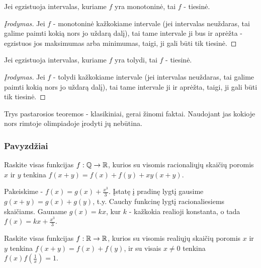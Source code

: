 \begin{thm}
  Jei egzistuoja intervalas, kuriame $f$ yra monotoninė, tai $f$ - tiesinė.
\end{thm}

\begin{proof}[Įrodymas]
  Jei $f$ - monotoninė kažkokiame intervale (jei intervalas neuždaras, tai
  galime paimti kokią nors jo uždarą dalį), tai tame intervale ji bus ir
  aprėžta - egzistuos jos maksimumas arba minimumas, taigi, ji gali
  būti tik tiesinė.
\end{proof}

\begin{thm}
  Jei egzistuoja intervalas, kuriame $f$ yra tolydi, tai $f$ - tiesinė.
\end{thm}

\begin{proof}[Įrodymas]
  Jei $f$ - tolydi kažkokiame intervale (jei intervalas neuždaras, tai
  galime paimti kokią nors jo uždarą dalį), tai tame intervale ji ir aprėžta,
  taigi, ji gali būti tik tiesinė.
\end{proof}

Trys pastarosios teoremos - klasikiniai, gerai žinomi faktai. Naudojant jas
kokioje nors rimtoje olimpiadoje įrodyti jų nebūtina.

\subsubsection{Pavyzdžiai}

\begin{pavnr}
  Raskite visas funkcijas $f:\mathbb Q\to\mathbb R$, kurios su visomis racionaliųjų
  skaičių poromis $x$ ir $y$ tenkina $f(x+y)=f(x)+f(y)+xy(x+y)$.
\end{pavnr}

\begin{sprendimas}
  Pakeiskime - $f(x)=g(x)+\frac{x^{3}}{3}$. Įstatę į pradinę lygtį gausime
  $g(x+y)=g(x)+g(y)$, t.y. Cauchy funkcinę lygtį racionaliesiems skaičiams.
  Gauname $g(x)=kx$, kur $k$ - kažkokia realioji konstanta, o tada
  $f(x)=kx+\frac{x^{3}}{3}$.
\end{sprendimas}


\begin{pavnr}
  Raskite visas funkcijas $f:\mathbb R\to\mathbb R$, kurios su visomis realiųjų
  skaičių poromis $x$ ir $y$ tenkina $f(x+y)=f(x)+f(y)$, ir su visais
  $x\not=0$ tenkina $f(x)f(\frac{1}{x})=1$.
\end{pavnr}

